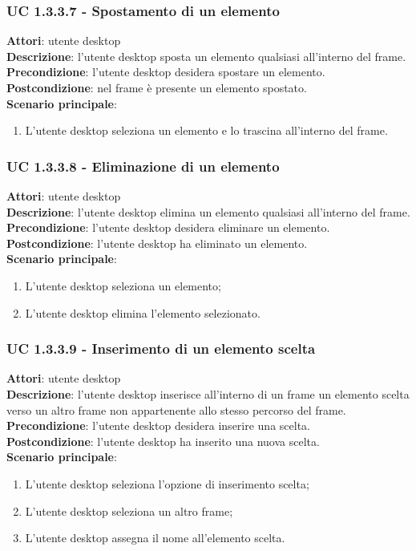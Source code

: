 \subsubsection{UC 1.3.3.7 - Spostamento di un elemento}{
	\label{uc1.3.3.7}
	\textbf{Attori}: utente desktop \\
	\textbf{Descrizione}: l'utente desktop sposta un elemento qualsiasi all'interno del frame. \\
	\textbf{Precondizione}: l'utente desktop desidera spostare un elemento.	\\
	\textbf{Postcondizione}: nel frame è presente un elemento spostato.	\\
	\textbf{Scenario principale}:
	\begin{enumerate}
		\item L'utente desktop seleziona un elemento e lo trascina all'interno del frame.
	\end{enumerate}
	}
\subsubsection{UC 1.3.3.8 - Eliminazione di un elemento}{
	\label{uc1.3.3.8}
	\textbf{Attori}: utente desktop \\
	\textbf{Descrizione}: l'utente desktop elimina un elemento qualsiasi all'interno del frame. \\
	\textbf{Precondizione}: l'utente desktop desidera eliminare un elemento.	\\
	\textbf{Postcondizione}: l'utente desktop ha eliminato un elemento.	\\
	\textbf{Scenario principale}:
	\begin{enumerate}
		\item L'utente desktop seleziona un elemento;
		\item L'utente desktop elimina l'elemento selezionato.
	\end{enumerate}
	}
\subsubsection{UC 1.3.3.9 - Inserimento di un elemento scelta}{
	\label{uc1.3.3.9}
	\textbf{Attori}: utente desktop \\
	\textbf{Descrizione}: l'utente desktop inserisce all'interno di un frame un elemento scelta verso un altro frame non appartenente allo stesso percorso del frame. \\
	\textbf{Precondizione}: l'utente desktop desidera inserire una scelta.	\\
	\textbf{Postcondizione}: l'utente desktop ha inserito una nuova scelta.	\\
	\textbf{Scenario principale}:
	\begin{enumerate}
		\item L'utente desktop seleziona l'opzione di inserimento scelta;
		\item L'utente desktop seleziona un altro frame;
		\item L'utente desktop assegna il nome all'elemento scelta.
	\end{enumerate}
	}
